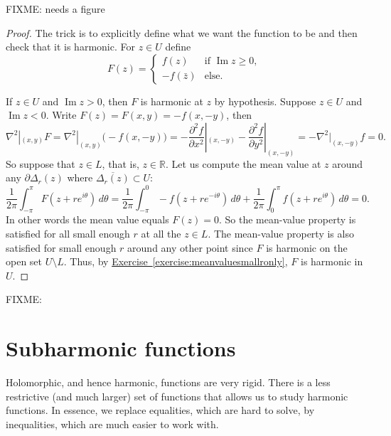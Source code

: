 \documentclass[12pt,openany]{book}
\renewcommand{\Im}{\operatorname{Im}}
\newcommand{\R}{{\mathbb{R}}}
\theoremstyle{plain}
\theoremstyle{remark}
\theoremstyle{definition}
\theoremstyle{exercise}
\theoremstyle{example}
\newcommand{\exerciseref}[1]{\hyperref[#1]{Exercise~\ref*{#1}}}
\begin{document}
FIXME: needs a figure

\begin{proof}
The trick is to explicitly define what we want the function to be and then
check that it is harmonic.
For $z \in U$ define
\begin{equation*}
F(z) =
\begin{cases}
f(z) & \text{if } \Im z \geq 0, \\
-f(\bar{z}) & \text{else} .
\end{cases}
\end{equation*}

If $z \in U$ and $\Im z > 0$, then $F$ is harmonic at $z$ by hypothesis.
Suppose $z \in U$ and $\Im z < 0$.  Write $F(z) = F(x,y) = -f(x,-y)$, then
\begin{equation*}
\nabla^2|_{(x,y)} F
=
\nabla^2|_{(x,y)} \bigl( -f(x,-y) \bigr)
=
- \frac{\partial^2 f}{\partial x^2}|_{(x,-y)}
- \frac{\partial^2 f}{\partial y^2}|_{(x,-y)}
=
- \nabla^2|_{(x,-y)} f = 0 .
\end{equation*}
So suppose that $z \in L$, that is, $z \in \R$.
Let us compute the mean value at $z$ around any
$\partial \Delta_r(z)$ where $\overline{\Delta_r(z)} \subset U$:
\begin{equation*}
\frac{1}{2\pi} \int_{-\pi}^{\pi} F(z+re^{i\theta})\, d\theta
=
\frac{1}{2\pi} \int_{-\pi}^{0} -f(z+re^{-i\theta})\, d\theta
+
\frac{1}{2\pi} \int_{0}^{\pi} f(z+re^{i\theta})\, d\theta
=
0 .
\end{equation*}
In other words the mean value equals $F(z) = 0$.
So the mean-value property is satisfied for all small enough
$r$ at all the $z \in L$.  The mean-value property
is also satisfied for small enough
$r$ around any other point since $F$ is harmonic on the open set $U
\setminus L$.
Thus, by \exerciseref{exercise:meanvaluesmallronly}, $F$ is harmonic in $U$.
\end{proof}

FIXME:



\section{Subharmonic functions}
\label{sec:subharmonic}

Holomorphic, and hence harmonic, functions are very rigid.
There is a less restrictive (and much larger) set of functions that allows
us to study harmonic functions.  In essence, we replace equalities, which are
hard to solve, by inequalities, which are much easier to work with.
\end{document}
